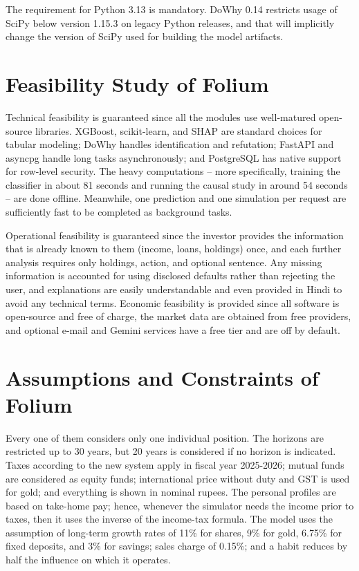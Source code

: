 The requirement for Python 3.13 is mandatory. DoWhy 0.14 restricts usage of SciPy below version 1.15.3 on legacy Python releases, and that will implicitly change the version of SciPy used for building the model artifacts.

\section{Feasibility Study of Folium}
Technical feasibility is guaranteed since all the modules use well-matured open-source libraries. XGBoost, scikit-learn, and SHAP are standard choices for tabular modeling; DoWhy handles identification and refutation; FastAPI and asyncpg handle long tasks asynchronously; and PostgreSQL has native support for row-level security. The heavy computations – more specifically, training the classifier in about 81 seconds and running the causal study in around 54 seconds – are done offline. Meanwhile, one prediction and one simulation per request are sufficiently fast to be completed as background tasks.

Operational feasibility is guaranteed since the investor provides the information that is already known to them (income, loans, holdings) once, and each further analysis requires only holdings, action, and optional sentence. Any missing information is accounted for using disclosed defaults rather than rejecting the user, and explanations are easily understandable and even provided in Hindi to avoid any technical terms. Economic feasibility is provided since all software is open-source and free of charge, the market data are obtained from free providers, and optional e-mail and Gemini services have a free tier and are off by default.

\section{Assumptions and Constraints of Folium}
Every one of them considers only one individual position. The horizons are restricted up to 30 years, but 20 years is considered if no horizon is indicated. Taxes according to the new system apply in fiscal year 2025-2026; mutual funds are considered as equity funds; international price without duty and GST is used for gold; and everything is shown in nominal rupees. The personal profiles are based on take-home pay; hence, whenever the simulator needs the income prior to taxes, then it uses the inverse of the income-tax formula. The model uses the assumption of long-term growth rates of 11\% for shares, 9\% for gold, 6.75\% for fixed deposits, and 3\% for savings; sales charge of 0.15\%; and a habit reduces by half the influence on which it operates.
